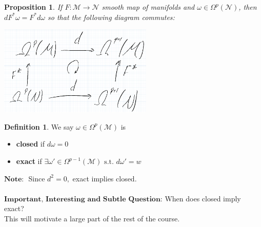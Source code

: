\documentclass[10pt]{article}
\theoremstyle{plain}
\newtheorem{prop}[thm]{Proposition}
\theoremstyle{definition}
\newtheorem{defn}[thm]{Definition} %
\newcommand{\st}{\text{ s.t. }}
\newcommand{\Note}{\textbf{Note: }}
\newcommand{\man}{\mathcal{M}}
\newcommand{\nan}{\mathcal{N}}
\newcommand{\pformman}[1]{\Omega^{#1}(\man)}
\newcommand{\pformnan}[1]{\Omega^{#1}(\nan)}
\newcommand{\deriv}{d}
\newcommand{\dw}{d\omega}
\begin{document}
\begin{prop}
If $F : \man \to \nan$ smooth map of manifolds and $\omega\in\pformnan{p}$, then $\deriv F^*\omega = F^*\dw$ so that the following diagram commutes:
\begin{center}\includegraphics[width=0.55\textwidth]{PullbackCommutesDifferential.png}\end{center}
\end{prop}
\begin{defn}
We say $\omega\in\pformman{p}$ is 
\begin{itemize}
    \item \textbf{closed} if $\dw = 0$
    \item \textbf{exact} if $\exists \omega' \in \pformman{p-1} \st \dw'=w$
\end{itemize}
\end{defn}
$\Note $ Since $\deriv^2 = 0,$ exact implies closed.
\\\\
$\textbf{Important, Interesting and Subtle Question:}$ When does closed imply exact? \\This will motivate a large part of the rest of the course.
\end{document}
